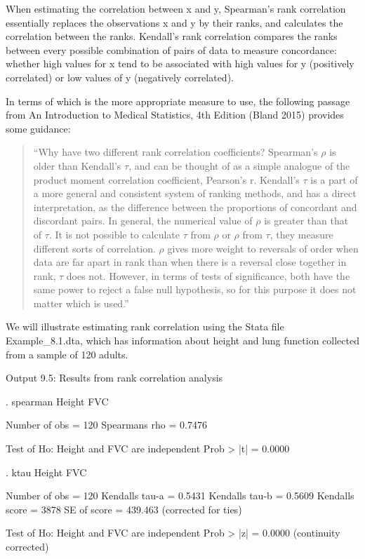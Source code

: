 \documentclass[
]{memoir}
\newenvironment{Shaded}{\begin{snugshade}}{\end{snugshade}}
\newcommand{\NormalTok}[1]{#1}
\begin{document}
When estimating the correlation between x and y, Spearman's rank correlation essentially replaces the observations x and y by their ranks, and calculates the correlation between the ranks. Kendall's rank correlation compares the ranks between every possible combination of pairs of data to measure concordance: whether high values for x tend to be associated with high values for y (positively correlated) or low values of y (negatively correlated).

In terms of which is the more appropriate measure to use, the following passage from An Introduction to Medical Statistics, 4th Edition (Bland 2015) provides some guidance:

\begin{quote}
``Why have two different rank correlation coefficients? Spearman's \(\rho\) is older than Kendall's \(\tau\), and can be thought of as a simple analogue of the product moment correlation coefficient, Pearson's r. Kendall's \(\tau\) is a part of a more general and consistent system of ranking methods, and has a direct interpretation, as the difference between the proportions of concordant and discordant pairs. In general, the numerical value of \(\rho\) is greater than that of \(\tau\). It is not possible to calculate \(\tau\) from \(\rho\) or \(\rho\) from \(\tau\), they measure different sorts of correlation. \(\rho\) gives more weight to reversals of order when data are far apart in rank than when there is a reversal close together in rank, \(\tau\) does not. However, in terms of tests of significance, both have the same power to reject a false null hypothesis, so for this purpose it does not matter which is used.''
\end{quote}

We will illustrate estimating rank correlation using the Stata file Example\_8.1.dta, which has information about height and lung function collected from a sample of 120 adults.

Output 9.5: Results from rank correlation analysis

\begin{Shaded}
\begin{Highlighting}[]
\NormalTok{. spearman Height FVC}

\NormalTok{ Number of obs =     120}
\NormalTok{Spearman\textquotesingle{}s rho =       0.7476}

\NormalTok{Test of Ho: Height and FVC are independent}
\NormalTok{    Prob \textgreater{} |t| =       0.0000}

\NormalTok{. ktau Height FVC}

\NormalTok{  Number of obs =     120}
\NormalTok{Kendall\textquotesingle{}s tau{-}a =       0.5431}
\NormalTok{Kendall\textquotesingle{}s tau{-}b =       0.5609}
\NormalTok{Kendall\textquotesingle{}s score =    3878}
\NormalTok{    SE of score =     439.463   (corrected for ties)}

\NormalTok{Test of Ho: Height and FVC are independent}
\NormalTok{     Prob \textgreater{} |z| =       0.0000  (continuity corrected)}
\end{Highlighting}
\end{Shaded}
\end{document}
